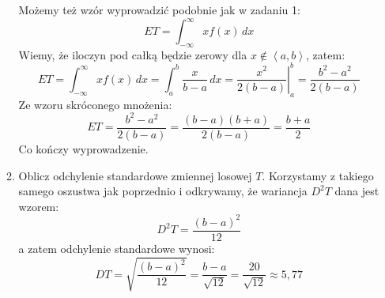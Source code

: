 \documentclass[twoside]{mwart}
\newenvironment{ansenv}{\comment}{\endcomment}
\newenvironment{ansenv}{\paragraph{Odpowiedź:}}{}
\begin{document}
\begin{enumerate}
\begin{enumerate}
\begin{ansenv}
	Możemy też wzór wyprowadzić podobnie jak w zadaniu 1:
	\[ ET = \int_{-\infty}^\infty xf(x)\, dx \]
	Wiemy, że iloczyn pod całką będzie zerowy dla $x\not\in\left<a,b\right>$, zatem:
	\[ ET = \int_{-\infty}^\infty xf(x)\, dx = \int_a^b \frac{x}{b-a}\, dx = \left.\frac{x^2}{2(b-a)}\right|_a^b = \frac{b^2-a^2}{2(b-a)} \]
	Ze wzoru skróconego mnożenia:
	\[ ET = \frac{b^2-a^2}{2(b-a)} = \frac{(b-a)(b+a)}{2(b-a)} = \frac{b+a}{2} \]
	Co kończy wyprowadzenie.
\end{ansenv}
\item Oblicz odchylenie standardowe zmiennej losowej $T$. 
\begin{ansenv}
	Korzystamy z takiego samego oszustwa jak poprzednio i odkrywamy, że wariancja $D^2T$ dana jest wzorem:
	\[ D^2T=\frac{(b-a)^2}{12} \]
	a zatem odchylenie standardowe wynosi:
	\[ DT = \sqrt{\frac{(b-a)^2}{12}} = \frac{b-a}{\sqrt{12}} = \frac{20}{\sqrt{12}} \approx 5{,}77 \]
	

\end{ansenv}
\end{enumerate}
\end{enumerate}
\end{document}
